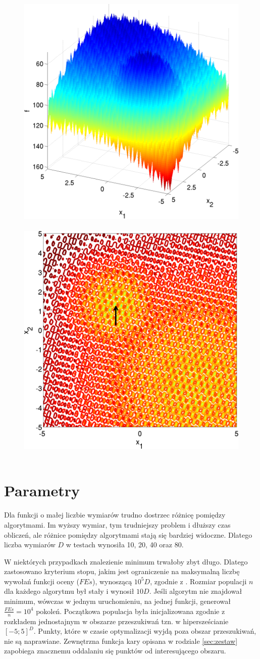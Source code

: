\documentclass[a4paper,onecolumn,oneside,11pt,wide,floatssmall]{mwrep}
\theoremstyle{definition}
\theoremstyle{plain}%
\theoremstyle{remark}
\begin{document}
\begin{figure}[H]
\centering
\mbox{
\includegraphics[width=.45\textwidth]{img/24.png} \quad
\includegraphics[width=.45\textwidth]{img/24a.png} 
}
\end{figure}

\section{Parametry}

Dla funkcji o małej liczbie wymiarów trudno dostrzec różnicę pomiędzy algorytmami. Im wyższy wymiar,
tym trudniejszy problem i dłuższy czas obliczeń, ale różnice pomiędzy algorytmami stają się bardziej 
widoczne. Dlatego liczba wymiarów $D$ w testach wynosiła 10, 20, 40 oraz 80. 

W niektórych przypadkach znalezienie minimum trwałoby zbyt długo. Dlatego zastosowano kryterium stopu,
jakim jest ograniczenie na maksymalną liczbę wywołań funkcji oceny ($FEs$), wynoszącą $10^5D$, 
zgodnie z \cite{setup}. Rozmiar populacji $n$ dla każdego algorytmu był stały i wynosił $10D$. 
Jeśli algorytm nie znajdował 
minimum, wówczas w jednym uruchomieniu, na jednej funkcji, generował $\frac{FEs}{n} = 10^4$ pokoleń.
Początkowa populacja była inicjalizowana zgodnie z rozkładem jednostajnym w obszarze przeszukiwań tzn.
w hipersześcianie $[-5; 5]^D$. Punkty, które w czasie optymalizacji wyjdą poza obszar
przeszukiwań, nie są naprawiane. Zewnętrzna funkcja kary opisana w rodziale \ref{sec:zestaw}
zapobiega znacznemu oddalaniu się punktów od interesującego obszaru.
\end{document}

